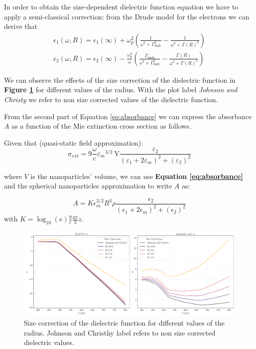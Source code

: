 \documentclass[twocolumn]{article}
\begin{document}
\begin{multicols}{2}
\noindent
In order to obtain the size-dependent dielectric function equation we have to apply a semi-classical correction: from the Drude model for the electrons we can derive that
$$
\begin{array}{l}
\epsilon_{1}(\omega, R)=\epsilon_{1}(\infty)+\omega_{p}^{2}\left(\frac{1}{\omega^{2}+\Gamma_{bulk}^{2}}-\frac{1}{\omega^{2}+\Gamma(R)^{2}}\right) \\
\epsilon_{2}(\omega, R)=\epsilon_{2}(\infty)-\frac{\omega_{p}^{2}}{\omega}\left(\frac{\Gamma_{bulk}}{\omega^{2}+\Gamma_{bulk}^{2}}-\frac{\Gamma(R)}{\omega^{2}+\Gamma(R)^{2}}\right)
\end{array}
$$

\noindent
We can observe the effects of the size correction of the dielectric function in \textbf{Figure \ref{fig:size_correction}} for different values of the radius. With the plot label \textit{Johnson and Christy} we refer to non size corrected values of the dielectric function.

From the second part of Equation \ref{eq:absorbance} we can express the absorbance $A$ as a function of the Mie extinction cross section as follows.

\noindent
Given that (quasi-static field approximation):
\begin{equation}
\sigma_{e x t}=9 \frac{\omega}{c} \varepsilon_{m}{ }^{3 / 2} \mathrm{~V} \frac{\varepsilon_{2}}{\left(\varepsilon_{1}+2 \varepsilon_{m}\right)^{2}+\left(\varepsilon_{2}\right)^{2}}
\end{equation}

\noindent
where $V$ is the nanoparticles' volume, we can use \textbf{Equation \ref{eq:absorbance}} and the spherical nanoparticles approximation to write $A$ as:

\begin{equation}
    A=K\epsilon_m^{3/2}R^3\rho\frac{\epsilon_2}{(\epsilon_1 + 2\epsilon_m)^2 + (\epsilon_2)^2}
    \label{eq:ass}
\end{equation}
with $K=\log_{10}(e)\frac{9}{c}\frac{4\pi}{3}z$.

\end{multicols}

\begin{figure}[H]
    \begin{minipage}[l]{1.0\columnwidth}
    \centering
    \includegraphics[width=\textwidth]{image/data/size_correction.pdf}
    \caption{Size correction of the dielectric function for different values of the radius. Johnson and Christhy label refers to non size corrected dielectric values.}
    \label{fig:size_correction}
    \end{minipage}
\end{figure}
\end{document}
